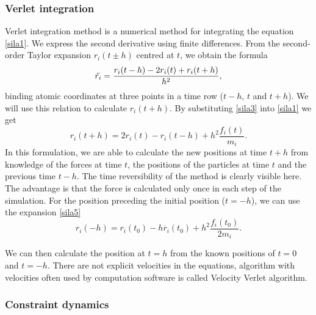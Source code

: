 \subsubsection{Verlet integration}
Verlet integration method is a numerical method for integrating the equation \ref{sila1}. We express the second derivative using finite differences. From the second-order Taylor expansion $r_i(t\pm h)$ centred at $t$, we obtain the formula
\begin{equation}\label{sila3}
	\Ddot{r_i}=\frac{r_i(t-h)-2r_i(t)+r_i(t+h)}{h^2},
\end{equation}
binding atomic coordinates at three points in a time row ($t-h$, $t$ and $t+h$). We will use this relation to calculate $r_i(t+h)$. By substituting \ref{sila3} into \ref{sila1} we get 
\begin{equation}\label{sila4}
	r_i(t+h)=2r_i(t)-r_i(t-h)+h^2\frac{f_i(t)}{m_i}.
\end{equation}
In this formulation, we are able to calculate the new positions at time $t+h$ from knowledge of the forces at time $t$, the positions of the particles at time $t$ and the previous time $t-h$. The time reversibility of the method is clearly visible here. The advantage is that the force is calculated only once in each step of the simulation. For the position preceding the initial position ($t=-h$), we can use the expansion \ref{sila5}
\begin{equation}\label{sila5}
	r_i(-h)=r_i(t_0)-h\dot{r_i}(t_0)+h^2\frac{f_i(t_0)}{2m_i}.
\end{equation}

We can then calculate the position at $t=h$ from the known positions of $t=0$ and $t=-h$. There are not explicit velocities in the equations, algorithm with velocities often used by computation software is called Velocity Verlet algorithm. \cite{mdskripta}

\subsubsection{Constraint dynamics}

